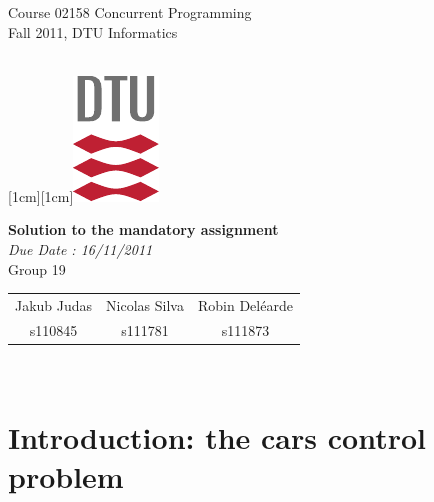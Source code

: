 \documentclass[a4paper,12pt,twoside]{article}
\begin{document}
\noindent\parbox[t]{9cm}{\textsf{Course 02158 Concurrent Programming\\
Fall 2011, DTU Informatics }}
\hfill
\parbox[t]{1cm}{\mbox{}\\
\raisebox{0.0cm}[1cm][1cm]{\includegraphics[origin=lb]{dtu_logo_cmyk.pdf}}}

\vspace{2cm}

\begin{center}
{\Large \bf Solution to the mandatory assignment}\\
\vspace{0.3cm}
{\it Due Date : 16/11/2011}\\
\vspace{1cm}
{\Large Group 19}\\
\vspace{0.3cm}
\begin{tabular}{ccc}
{\large Jakub Judas}&{\large Nicolas Silva}&{\large Robin Del\'earde}\\
s110845&s111781&s111873
\end{tabular}\\
\end{center}

\newpage

\section{Introduction: the cars control problem}








\end{document}
